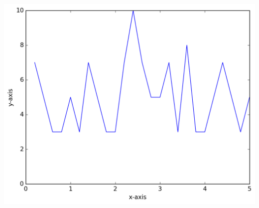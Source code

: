 \documentclass[a4paper]{article}
\begin{document}
\begin {description}
\begin{doublespace}
\begin{center}
\includegraphics[scale=0.65]{Problem_3_2.png}
\end{center}
\end{doublespace}


\end {description}
\end{document}
